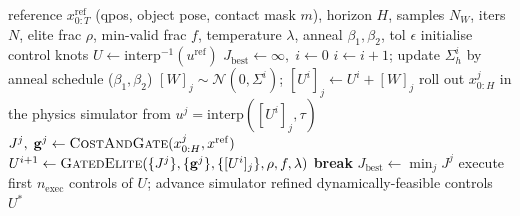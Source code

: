 \begin{algorithm}[t]
\caption{Sampling-Based Retargeting with Multi-Scale Contact Reward
         and Part-wise Penetration Constraints}
\label{alg:core4d-mpc}
\begin{algorithmic}[1]
\Require reference $x^{\mathrm{ref}}_{0:T}$ (qpos, object pose, contact mask $m$),
         horizon $H$, samples $N_W$, iters $N$, elite frac $\rho$,
         min-valid frac $f$, temperature $\lambda$, anneal $\beta_1,\beta_2$, tol $\epsilon$
\State initialise control knots $U \gets \mathrm{interp}^{-1}(u^{\mathrm{ref}})$
          
  \State $J_{\text{best}} \gets \infty,\; i \gets 0$
           
    \State $i \gets i+1$;\; update $\Sigma^{i}_{h}$ by anneal schedule ($\beta_1,\beta_2$)
      \State $[W]_j \sim \mathcal N(0,\Sigma^{i})$;\;\; $[U^i]_j \gets U^i + [W]_j$
      \State roll out $x^{j}_{0:H}$ in the physics simulator from $u^j = \mathrm{interp}([U^i]_j,\tau)$
      \State $J^j,\; \mathbf g^j \gets \Call{CostAndGate}{x^{j}_{0:H}, x^{\mathrm{ref}}}$
    \EndFor
    \State $U^{i+1} \gets \Call{GatedElite}{\{J^j\},\{\mathbf g^j\},\{[U^i]_j\},\rho,f,\lambda}$
     \State \textbf{break} 
    \EndIf
    \State $J_{\text{best}} \gets \min_j J^j$
  \EndWhile
  \State execute first $n_{\text{exec}}$ controls of $U$;\; advance simulator
\EndFor
\State \Return refined dynamically-feasible controls $U^{*}$
\end{algorithmic}
\end{algorithm}

